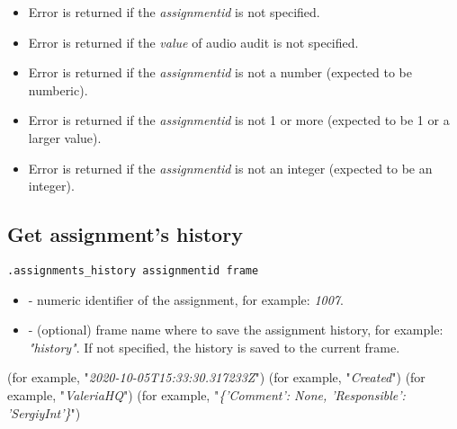 \errheader
\begin{itemize}
    \item Error  is returned if the \textit{assignmentid} is not specified.
    \item Error  is returned if the \textit{value} of audio audit is not specified.
    \item Error  is returned if the \textit{assignmentid} is not a number (expected to be numberic).
    \item Error  is returned if the \textit{assignmentid} is not 1 or more (expected to be 1 or a larger value).
    \item Error  is returned if the \textit{assignmentid} is not an integer (expected to be an integer).
\end{itemize}

\subsection{Get assignment's history}

\begin{lstlisting}[style=CommandLineStyle]
.assignments_history assignmentid frame
\end{lstlisting}

\paramsheader
\begin{itemize}
    \item {} - numeric identifier of the assignment, for example: \textit{1007}.
    \item {} - (optional) frame name where to save the assignment history, for example: \textit{"history"}. If not specified, the history is saved to the current frame.

\end{itemize}


\begin{compactitem}
     (for example, "\textit{2020-10-05T15:33:30.317233Z}")
     (for example, "\textit{Created}")
     (for example, "\textit{ValeriaHQ}")
     (for example, "\textit{\{'Comment': None, 'Responsible': 'SergiyInt'\}}")
\end{compactitem}

